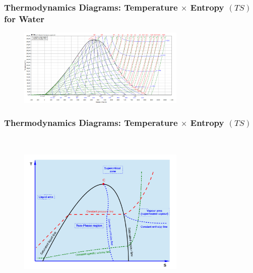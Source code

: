 \documentclass[10pt,compress]{beamer}
\begin{document}
\begin{frame}
 \frametitle{Thermodynamics Diagrams: Temperature $\times$ Entropy $(TS)$ for Water}
  \begin{center}
   \begin{figure}
     \includegraphics[width=8cm,height=7.cm,clip]{./Pics/water_TS.png}
   \end{figure}
   \end{center}
\end{frame}

\begin{frame}
 \frametitle{Thermodynamics Diagrams: Temperature $\times$ Entropy $(TS)$}
  \begin{center}
   \begin{figure}
      \includegraphics[width=8cm,height=7.9cm,clip]{./Pics/TS_Diag_Schematics}
   \end{figure}
   \end{center}
\end{frame}
\end{document}
